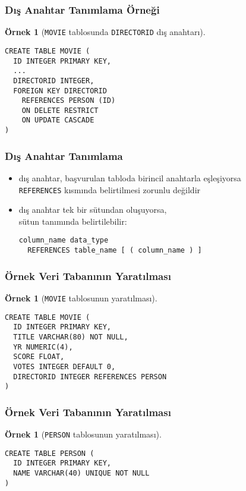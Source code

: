 \documentclass[dvipsnames]{beamer}
\theoremstyle{definition}
\theoremstyle{example}
\newtheorem{ornek}[theorem]{Örnek}
\theoremstyle{plain}
\begin{document}
\begin{frame}[fragile]
  \frametitle{Dış Anahtar Tanımlama Örneği}

  \begin{ornek}[\texttt{MOVIE} tablosunda \texttt{DIRECTORID} dış anahtarı]
    \begin{lstlisting}
CREATE TABLE MOVIE (
  ID INTEGER PRIMARY KEY,
  ...
  DIRECTORID INTEGER,
  FOREIGN KEY DIRECTORID
    REFERENCES PERSON (ID)
    ON DELETE RESTRICT
    ON UPDATE CASCADE
)
    \end{lstlisting}
  \end{ornek}
\end{frame}

\begin{frame}[fragile]
  \frametitle{Dış Anahtar Tanımlama}

  \begin{itemize}
    \item dış anahtar, başvurulan tabloda birincil anahtarla eşleşiyorsa\\
      \texttt{REFERENCES} kısmında belirtilmesi zorunlu değildir

    \pause
    \medskip
    \item dış anahtar tek bir sütundan oluşuyorsa,\\
      sütun tanımında belirtilebilir:
    \begin{lstlisting}
column_name data_type
  REFERENCES table_name [ ( column_name ) ]
    \end{lstlisting}
  \end{itemize}
\end{frame}

\begin{frame}[fragile]
  \frametitle{Örnek Veri Tabanının Yaratılması}

  \begin{ornek}[\texttt{MOVIE} tablosunun yaratılması]
    \begin{lstlisting}
CREATE TABLE MOVIE (
  ID INTEGER PRIMARY KEY,
  TITLE VARCHAR(80) NOT NULL,
  YR NUMERIC(4),
  SCORE FLOAT,
  VOTES INTEGER DEFAULT 0,
  DIRECTORID INTEGER REFERENCES PERSON
)
    \end{lstlisting}
  \end{ornek}
\end{frame}

\begin{frame}[fragile]
  \frametitle{Örnek Veri Tabanının Yaratılması}

  \begin{ornek}[\texttt{PERSON} tablosunun yaratılması]
    \begin{lstlisting}
CREATE TABLE PERSON (
  ID INTEGER PRIMARY KEY,
  NAME VARCHAR(40) UNIQUE NOT NULL
)
    \end{lstlisting}
  \end{ornek}
\end{frame}
\end{document}
